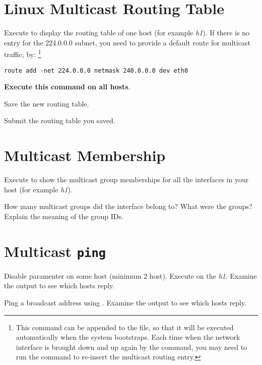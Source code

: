\documentclass{../UTNetLab}
\begin{document}
\section{Linux Multicast Routing Table}
\label{sec:linux-multicast-routing}
Execute  to display the routing table of one host (for example \textit{h1}).
If there is no entry for the 224.0.0.0 subnet, you need to provide a default route for multicast traffic, by:
\footnote{This command can be appended to the  file, so that it will be executed automatically when the system bootstraps.
    Each time when the network interface is brought down and up again by the  command, you may need to run the  command to re-insert the multicast routing entry.}
\begin{lstlisting}[emph=eth0,morekeywords={[3]add,netmask,dev}]
route add -net 224.0.0.0 netmask 240.0.0.0 dev eth0
    \end{lstlisting}
\textbf{Execute this command on all hosts}.

Save the new routing table.

\begin{report}
    \item Submit the routing table you saved.
\end{report}

\section{Multicast Membership}
Execute  to show the multicast group memberships for all the interfaces in your host (for example \textit{h1}).

\begin{report}
    \item How many multicast groups did the interface belong to? What were the groups? Explain the meaning of the group IDs.
\end{report}

\section{Multicast \texttt{ping}}
Disable  paramenter on some host (minimum 2 host).
Execute  on the \textit{h1}.
Examine the  output to see which hosts reply.

Ping a broadcast address using .
Examine the  output to see which hosts reply.
\end{document}
